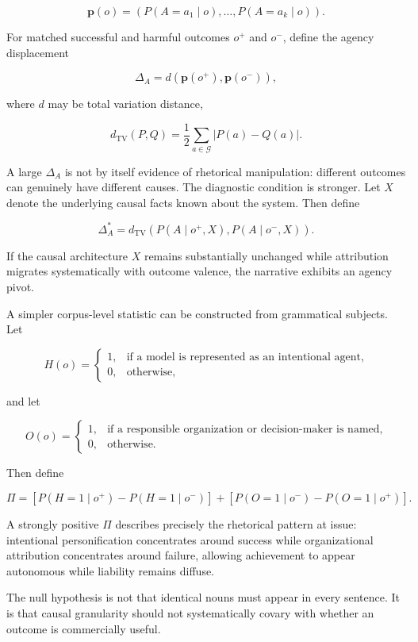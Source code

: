 \documentclass[11pt]{article}
\begin{document}
\[
\mathbf p(o)
=
\left(
P(A=a_1\mid o),
\ldots,
P(A=a_k\mid o)
\right).
\]

For matched successful and harmful outcomes \(o^+\) and \(o^-\), define the
agency displacement

\[
\Delta_A
=
d\!\left(
\mathbf p(o^+),
\mathbf p(o^-)
\right),
\]

where \(d\) may be total variation distance,

\[
d_{\mathrm{TV}}(P,Q)
=
\frac12
\sum_{a\in\mathcal G}
|P(a)-Q(a)|.
\]

A large \(\Delta_A\) is not by itself evidence of rhetorical manipulation:
different outcomes can genuinely have different causes. The diagnostic
condition is stronger. Let \(X\) denote the underlying causal facts known
about the system. Then define

\[
\Delta_A^{*}
=
d_{\mathrm{TV}}
\left(
P(A\mid o^+,X),
P(A\mid o^-,X)
\right).
\]

If the causal architecture \(X\) remains substantially unchanged while
attribution migrates systematically with outcome valence, the narrative
exhibits an agency pivot.

A simpler corpus-level statistic can be constructed from grammatical
subjects. Let

\[
H(o)=
\begin{cases}
1,&\text{if a model is represented as an intentional agent},\\
0,&\text{otherwise},
\end{cases}
\]

and let

\[
O(o)=
\begin{cases}
1,&\text{if a responsible organization or decision-maker is named},\\
0,&\text{otherwise}.
\end{cases}
\]

Then define

\[
\Pi
=
\left[
P(H=1\mid o^+)-P(H=1\mid o^-)
\right]
+
\left[
P(O=1\mid o^-)-P(O=1\mid o^+)
\right].
\]

A strongly positive \(\Pi\) describes precisely the rhetorical pattern at
issue: intentional personification concentrates around success while
organizational attribution concentrates around failure, allowing achievement
to appear autonomous while liability remains diffuse.

The null hypothesis is not that identical nouns must appear in every
sentence. It is that causal granularity should not systematically covary with
whether an outcome is commercially useful.
\end{document}
